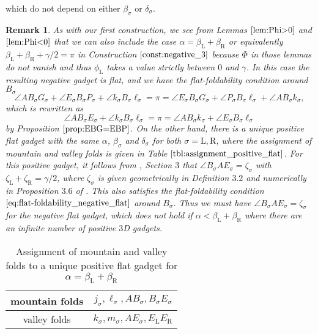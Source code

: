 \documentclass[11pt]{amsart}
\newtheorem{remark}[theorem]{Remark}
\numberwithin{equation}{section}
\numberwithin{theorem}{section}
\newcommand{\Lt}{\ensuremath{\mathrm{L}}}
\newcommand{\Rt}{\ensuremath{\mathrm{R}}}
\begin{document}
which do not depend on either $\beta_\sigma$ or $\delta_\sigma$.
\begin{remark}\rm
As with our first construction, we see from Lemmas $\ref{lem:Phi>0}$ and $\ref{lem:Phi<0}$
that we can also include the case $\alpha =\beta_\Lt +\beta_\Rt$ or equivalently $\beta_\Lt +\beta_\Rt +\gamma /2=\pi$ in Construction $\ref{const:negative_3}$
because $\Phi$ in those lemmas do not vanish and thus $\phi_\Lt$ takes a value strictly between $0$ and $\gamma$.
In this case the resulting negative gadget is flat, and we have the flat-foldability condition around $B_\sigma$
\begin{equation*}
\angle AB_\sigma G_\sigma +\angle E_\sigma B_\sigma P_\sigma +\angle k_\sigma B_\sigma \ell_\sigma =\pi
=\angle E_\sigma B_\sigma G_\sigma +\angle P_\sigma B_\sigma \ell_\sigma +\angle AB_\sigma k_\sigma ,
\end{equation*}
which is rewritten as
\begin{equation}\label{eq:flat-foldability_negative_flat}
\angle AB_\sigma E_\sigma +\angle k_\sigma B_\sigma \ell_\sigma =\pi =\angle AB_\sigma k_\sigma +\angle E_\sigma B_\sigma \ell_\sigma
\end{equation}
by Proposition $\ref{prop:EBG=EBP}$.
On the other hand, there is a unique positive flat gadget with the same $\alpha$, $\beta_\sigma$ and $\delta_\sigma$ for both $\sigma =\Lt ,\Rt$,
where the assignment of mountain and valley folds is given in Table $\ref{tbl:assignment_positive_flat}$.
For this positive gadget, it follows from \cite{Doi20}, Section $3$ that $\angle B_\sigma AE_\sigma =\zeta_\sigma$ with $\zeta_\Lt +\zeta_\Rt =\gamma /2$,
where $\zeta_\sigma$ is given geometrically in Definition $3.2$ and numerically in Proposition $3.6$ of \cite{Doi20}.
This also satisfies the flat-foldability condition $\eqref{eq:flat-foldability_negative_flat}$ around $B_\sigma$.
Thus we must have $\angle B_\sigma AE_\sigma =\zeta_\sigma$ for the \emph{negative} flat gadget,
which does not hold if $\alpha <\beta_\Lt +\beta_\Rt$ where there are an infinite number of positive $3$D gadgets.
\end{remark}
\addtocounter{theorem}{1}
\begin{table}[h]
\begin{tabular}{c|c}
mountain folds&$j_\sigma ,\ell_\sigma ,AB_\sigma ,B_\sigma E_\sigma$\\ \hline
valley folds&$k_\sigma ,m_\sigma ,AE_\sigma ,E_\Lt E_\Rt$
\end{tabular}\vspace{0.5cm}
\caption{Assignment of mountain and valley folds to a unique positive flat gadget for $\alpha =\beta_\Lt +\beta_\Rt$}
\label{tbl:assignment_positive_flat}
\end{table}
\end{document}
